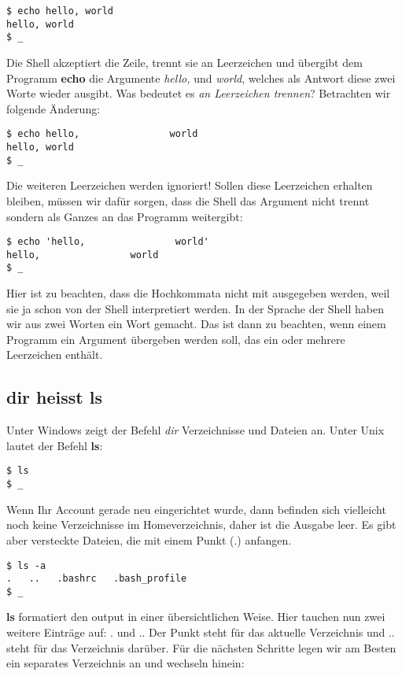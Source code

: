 \documentclass[titlepage,a4paper]{article}
\begin{document}
\begin{verbatim}
$ echo hello, world
hello, world
$ _
\end{verbatim}

Die Shell akzeptiert die Zeile, trennt sie an Leerzeichen und übergibt dem
Programm \textbf{echo} die Argumente \emph{hello,} und \emph{world}, welches
als Antwort diese zwei Worte wieder ausgibt.  Was bedeutet es \emph{an
  Leerzeichen trennen}?  Betrachten wir folgende Änderung:

\begin{verbatim}
$ echo hello,                world
hello, world
$ _
\end{verbatim}

Die weiteren Leerzeichen werden ignoriert!  Sollen diese Leerzeichen erhalten
bleiben, müssen wir dafür sorgen, dass die Shell das Argument nicht trennt
sondern als Ganzes an das Programm weitergibt:

\begin{verbatim}
$ echo 'hello,                world'
hello,                world
$ _
\end{verbatim}

Hier ist zu beachten, dass die Hochkommata nicht mit ausgegeben werden, weil
sie ja schon von der Shell interpretiert werden.  In der Sprache der Shell
haben wir aus zwei Worten ein Wort gemacht.  Das ist dann zu beachten, wenn
einem Programm ein Argument übergeben werden soll, das ein oder mehrere
Leerzeichen enthält.

\subsection{dir heisst ls}
\label{sec:ls}

Unter Windows zeigt der Befehl \emph{dir} Verzeichnisse und Dateien an.  Unter
Unix lautet der Befehl \textbf{ls}:

\begin{verbatim}
$ ls
$ _
\end{verbatim}

Wenn Ihr Account gerade neu eingerichtet wurde, dann befinden sich vielleicht
noch keine Verzeichnisse im Homeverzeichnis, daher ist die Ausgabe leer.
Es gibt aber versteckte Dateien, die mit einem Punkt (.) anfangen.

\begin{verbatim}
$ ls -a
.   ..   .bashrc   .bash_profile
$ _
\end{verbatim}

\textbf{ls} formatiert den output in einer übersichtlichen Weise.  Hier
tauchen nun zwei weitere Einträge auf: . und ..  Der Punkt steht für das
aktuelle Verzeichnis und .. steht für das Verzeichnis darüber.
Für die nächsten Schritte legen wir am Besten ein separates Verzeichnis an
und wechseln hinein:
\end{document}
